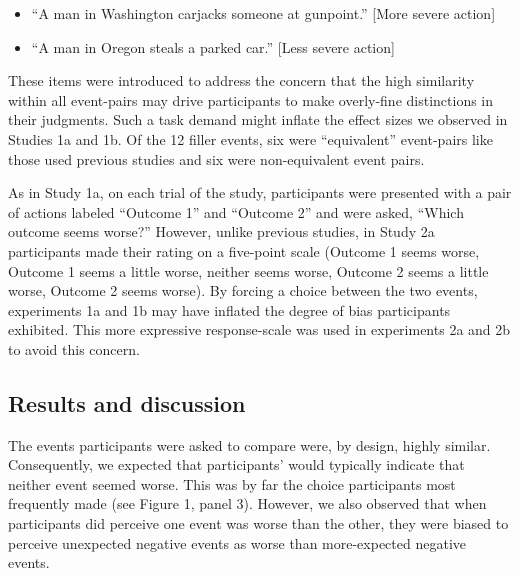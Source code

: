 \documentclass[10pt, letterpaper]{article}
\begin{document}
\begin{itemize}
\item
  ``A man in Washington carjacks someone at gunpoint.'' {[}More severe
  action{]}
\item
  ``A man in Oregon steals a parked car.'' {[}Less severe action{]}
\end{itemize}

These items were introduced to address the concern that the high
similarity within all event-pairs may drive participants to make
overly-fine distinctions in their judgments. Such a task demand might
inflate the effect sizes we observed in Studies 1a and 1b. Of the 12
filler events, six were ``equivalent'' event-pairs like those used
previous studies and six were non-equivalent event pairs.

As in Study 1a, on each trial of the study, participants were presented
with a pair of actions labeled ``Outcome 1'' and ``Outcome 2'' and were
asked, ``Which outcome seems worse?'' However, unlike previous studies,
in Study 2a participants made their rating on a five-point scale
(Outcome 1 seems worse, Outcome 1 seems a little worse, neither seems
worse, Outcome 2 seems a little worse, Outcome 2 seems worse). By
forcing a choice between the two events, experiments 1a and 1b may have
inflated the degree of bias participants exhibited. This more expressive
response-scale was used in experiments 2a and 2b to avoid this concern.

\subsection{Results and discussion}\label{results-and-discussion-2}

The events participants were asked to compare were, by design, highly
similar. Consequently, we expected that participants' would typically
indicate that neither event seemed worse. This was by far the choice
participants most frequently made (see Figure 1, panel 3). However, we
also observed that when participants did perceive one event was worse
than the other, they were biased to perceive unexpected negative events
as worse than more-expected negative events.
\end{document}
